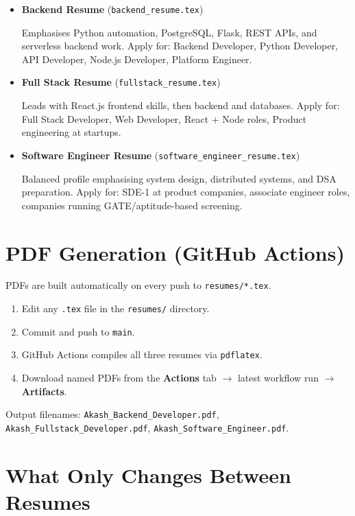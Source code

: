 \documentclass[a4paper,11pt]{article}
\begin{document}
\begin{itemize}

\item \textbf{Backend Resume} (\texttt{backend\_resume.tex})

Emphasises Python automation, PostgreSQL, Flask, REST APIs, and serverless backend work.
Apply for: Backend Developer, Python Developer, API Developer, Node.js Developer, Platform Engineer.

\item \textbf{Full Stack Resume} (\texttt{fullstack\_resume.tex})

Leads with React.js frontend skills, then backend and databases.
Apply for: Full Stack Developer, Web Developer, React + Node roles, Product engineering at startups.

\item \textbf{Software Engineer Resume} (\texttt{software\_engineer\_resume.tex})

Balanced profile emphasising system design, distributed systems, and DSA preparation.
Apply for: SDE-1 at product companies, associate engineer roles, companies running GATE/aptitude-based screening.

\end{itemize}

\section*{PDF Generation (GitHub Actions)}

PDFs are built automatically on every push to \texttt{resumes/*.tex}.

\begin{enumerate}
\item Edit any \texttt{.tex} file in the \texttt{resumes/} directory.
\item Commit and push to \texttt{main}.
\item GitHub Actions compiles all three resumes via \texttt{pdflatex}.
\item Download named PDFs from the \textbf{Actions} tab $\rightarrow$ latest workflow run $\rightarrow$ \textbf{Artifacts}.
\end{enumerate}

Output filenames: \texttt{Akash\_Backend\_Developer.pdf}, \texttt{Akash\_Fullstack\_Developer.pdf}, \texttt{Akash\_Software\_Engineer.pdf}.

\section*{What Only Changes Between Resumes}
\end{document}
